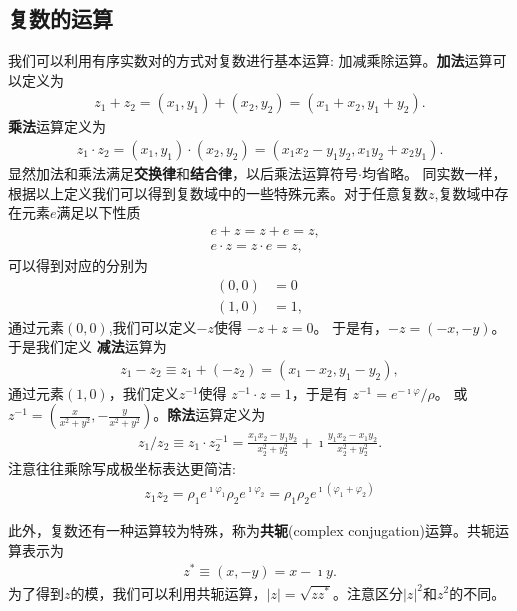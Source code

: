 \subsection{复数的运算}
我们可以利用有序实数对的方式对复数进行基本运算: 加减乘除运算。{\bf 加法}运算可以定义为
\begin{align}
    z_1 + z_2 = (x_1, y_1) + (x_2, y_2) = (x_1 + x_2, y_1 + y_2) .
\end{align}
{\bf 乘法}运算定义为
\begin{align}
    z_1 \cdot z_2 = (x_1, y_1) \cdot (x_2, y_2) = (x_1 x_2 - y_1 y_2, x_1 y_2 + x_2 y_1) .
\end{align}
显然加法和乘法满足{\bf 交换律}和{\bf 结合律}，以后乘法运算符号$\cdot$均省略。
同实数一样，根据以上定义我们可以得到复数域中的一些特殊元素。对于任意复数$z$,复数域中存在元素$e$满足以下性质
\begin{align}
    & e + z = z + e = z ,\\ 
    & e \cdot z = z \cdot e = z , 
\end{align}
可以得到对应的分别为
\begin{align}
    (0, 0) &= 0\\
    (1, 0) &= 1 ,
\end{align}
通过元素$(0,0)$,我们可以定义$-z$使得 $-z + z = 0$。 于是有，$- z = (-x, -y)$。于是我们定义
{\bf 减法}运算为 
\begin{align}
    z_1 - z_2 \equiv z_1 + (-z_2) = (x_1 - x_2, y_1 - y_2) ,
\end{align}
通过元素$(1,0)$，我们定义$z^{-1}$使得
$z^{-1} \cdot z = 1$，于是有 $z^{-1} =e^{-\imath \varphi}/\rho  $。
或$z^{-1} = (\frac{x}{x^2 + y^2}, -\frac{y}{x^2 + y^2})$。{\bf 除法}运算定义为
\begin{align}
    z_1 / z_2 \equiv z_1 \cdot z_2^{-1} = \frac{x_1 x_2 - y_1 y_2} {x_2^2  +  y_2^2 }  + \imath \frac{y_1 x_2 - x_1 y_2} {x_2^2  +  y_2^2 } . 
\end{align}
注意往往乘除写成极坐标表达更简洁:
\begin{align}
    z_1 z_2 = \rho_1 e^{\imath \varphi_1 } \rho_2 e^{\imath \varphi_2 } = \rho_1 \rho_2 e^{\imath (\varphi_1 + \varphi_2)}
\end{align}

此外，复数还有一种运算较为特殊，称为{\bf 共轭}(complex conjugation)运算。共轭运算表示为
\begin{align}
    z^{*} \equiv (x, -y) = x - \imath y .
\end{align}
为了得到$z$的模，我们可以利用共轭运算，$|z| = \sqrt{zz^{*}}$。注意区分$|z|^2$和$z^2$的不同。

